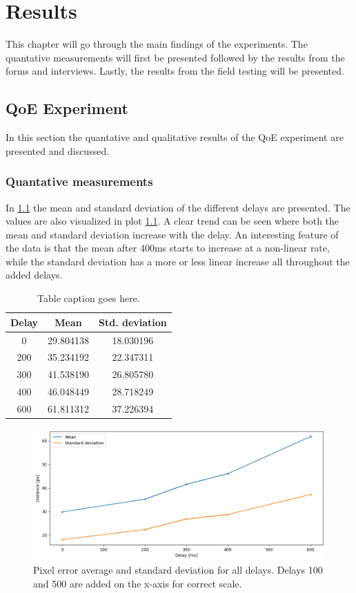 \documentclass[nofilelist]{cslthse-msc}
\begin{document}
\chapter{Results}
This chapter will go through the main findings of the experiments. The quantative measurements will first be presented followed by the results from the forms and interviews. Lastly, the results from the field testing will be presented.

\section{QoE Experiment}
In this section the quantative and qualitative results of the QoE experiment are presented and discussed. 

\subsection{Quantative measurements}
In \ref{tab:averages} the mean and standard deviation of the different delays are presented. The values are also visualized in plot \ref{fig:avg-std}. A clear trend can be seen where both the mean and standard deviation increase with the delay. An interesting feature of the data is that the mean after 400ms starts to increase at a non-linear rate, while the standard deviation has a more or less linear increase all throughout the added delays.

\begin{table}[ht]
   \centering
   \begin{tabular}{|c|c|c|}
   \hline
   \textbf{Delay} & \textbf{ Mean} & \textbf{Std. deviation} \\
   \hline
   0 & 29.804138 & 18.030196 \\ \hline
   200 & 35.234192 & 22.347311 \\ \hline
   300 & 41.538190 & 26.805780 \\ \hline
   400 & 46.048449 & 28.718249 \\ \hline
   600 & 61.811312 & 37.226394 \\ \hline
   \end{tabular}
   \caption{Table caption goes here.}
   \label{tab:averages}
\end{table}


\begin{figure}[!hbt]
   \centering
   \includegraphics[scale=0.5]{images/avg-std.png} 
   \caption{Pixel error average and standard deviation for all delays. Delays 100 and 500 are added on the x-axis for correct scale.}
   \label{fig:avg-std}
\end{figure}
\end{document}

